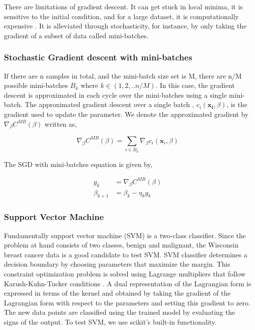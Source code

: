 There are limitations of gradient descent. It can get stuck in local minima, it is sensitive to the initial condition, and for a large dataset, it is computationally expensive \cite{mehta2019high}. It is alleviated through stochasticity, for instance, by only taking the gradient of a subset of data called mini-batches. 

\subsubsection{Stochastic Gradient descent with mini-batches}\label{subsec:SGD}
If there are n samples in total, and the mini-batch size set is M, there are n/M possible mini-batches $B_k $ where $k \in (1,2,..n/M)$. In this case, the gradient descent is approximated in each cycle over the mini-batches using a single mini-batch. The approximated gradient descent over a single batch , $c_i(\mathbf{x_i},\beta)$, is the gradient used to update the parameter. We denote the approximated gradient by $\nabla_\beta C^{MB}(\beta)$ written as, 

\begin{equation}
    \nabla_{\beta} C^{MB}(\beta) = \sum_{i\in B_k} \nabla_\beta c_i(\textbf{x}_i, \beta)
\end{equation}


The SGD with mini-batches equation is given by, 

\begin{align}
    g_k &=  \nabla_{\beta} C^{MB}(\beta)\\
\beta_{k+1} &= \beta_k - \eta_k g_k
\end{align}


\subsubsection{Support Vector Machine}\label{subsubsec:SVM}
Fundamentally support vector machine (SVM) is a two-class classifier. Since the problem at hand consists of two classes, benign and malignant, the Wisconsin breast cancer data is a good candidate to test SVM. SVM classifier determines a decision boundary by choosing parameters that maximize the margin. This constraint optimization problem is solved using Lagrange multipliers that follow Karush-Kuhn-Tucker conditions \cite{bishop2006pattern}. A dual representation of the Lagrangian form is expressed in terms of the kernel and obtained by taking the gradient of the Lagrangian form with respect to the parameters and setting this gradient to zero. The new data points are classified using the trained model by evaluating the signs of the output. To test SVM, we use scikit's built-in functionality. 